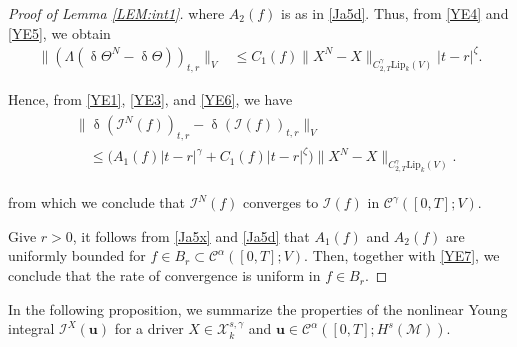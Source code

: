 \documentclass[letterpaper, 11pt,  reqno]{amsart}
\newcommand{\1}{\hspace{0.5mm}\text{I}\hspace{0.5mm}}
\newcommand{\I}{\mathcal{I}}
\newcommand{\noi}{\noindent}
\newcommand{\CC}{\mathcal{C}}
\newcommand{\al}{\alpha}
\newcommand{\updl}{\updelta}
\newcommand{\g}{\gamma}
\newcommand{\M}{\mathcal{M}}
\newcommand{\cX}{\mathcal{X}}
\newcommand{\Lip}{\mathrm{Lip}}
\newcommand{\uu}{\mathbf{u}}
\newcommand{\z}{\zeta}
\newcommand{\Ta}{\Theta}
\numberwithin{equation}{section}
\numberwithin{theorem}{section}
\begin{document}
\begin{proof}[Proof of Lemma \ref{LEM:int1}]
\noi
where $A_2(f)$ is as in 
\eqref{Ja5d}.
Thus, from \eqref{YE4} and \eqref{YE5}, we obtain
\begin{align}
\|(\Lambda (\updl \Theta^N - \updl \Ta))_{t,r}\|_{V}
& \le 
C_1(f)
 \|X^N - X\|_{C^\g_{2,T}\Lip_k(V)}
|t-r|^{\z}.
\label{YE6}
\end{align}


Hence, from \eqref{YE1}, \eqref{YE3}, and \eqref{YE6}, we have
\begin{align}
\begin{split}
& \|\updl (\I^N(f))_{t, r} - \updl (\I(f))_{t, r}\|_{V}  \\
& \quad \le 
\Big( A_1(f) |t - r|^\g
+  C_1(f)
|t-r|^{\z}\Big)
\|X^N - X\|_{C^\g_{2,T}\Lip_k(V)}.
\end{split}
\label{YE7}
\end{align}

\noi
from which 
we conclude 
that $\I^N(f)$ converges
to $\I(f)$ in $\CC^\g([0, T]; V)$.

Give $r > 0$, it follows from \eqref{Ja5x}
and 
\eqref{Ja5d}
that 
$A_1(f)$ and $A_2(f)$
are uniformly bounded
for $f \in B_r\subset \CC^{\al}([0,T];V)$.
Then, together with \eqref{YE7}, 
we conclude that  
the rate of convergence is
uniform in $f \in B_r$.  
\end{proof}






In the following proposition, 
we summarize
the properties
of the nonlinear Young integral
$\I^X(\uu)$
for a driver 
 $X\in \cX^{s, \g}_k$
 and $\uu \in  \CC^{\al}([0,T]; H^s(\M))$. 
\end{document}
